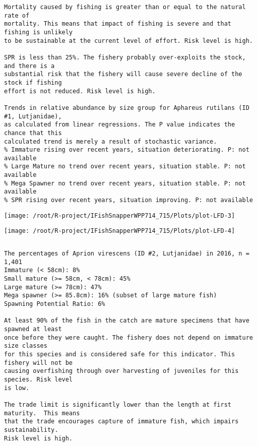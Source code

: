 \documentclass{report}\usepackage[]{graphicx}\usepackage[]{color}
\makeatletter
\def\maxwidth{ %
  \ifdim\Gin@nat@width>\linewidth
    \linewidth
  \else
    \Gin@nat@width
  \fi
}
\newenvironment{kframe}{%
 \def\at@end@of@kframe{}%
 \ifinner\ifhmode%
  \def\at@end@of@kframe{\end{minipage}}%
  \begin{minipage}{\columnwidth}%
 \fi\fi%
 \def\FrameCommand##1{\hskip\@totalleftmargin \hskip-\fboxsep
 \colorbox{shadecolor}{##1}\hskip-\fboxsep
     \hskip-\linewidth \hskip-\@totalleftmargin \hskip\columnwidth}%
 \MakeFramed {\advance\hsize-\width
   \@totalleftmargin\z@ \linewidth\hsize
   \@setminipage}}%
 {\par\unskip\endMakeFramed%
 \at@end@of@kframe}
\newenvironment{knitrout}{}{} %
\makeatother
\begin{document}
\begin{knitrout}
\begin{kframe}
\begin{verbatim}
Mortality caused by fishing is greater than or equal to the natural rate of
mortality. This means that impact of fishing is severe and that fishing is unlikely
to be sustainable at the current level of effort. Risk level is high.
 
SPR is less than 25%. The fishery probably over-exploits the stock, and there is a
substantial risk that the fishery will cause severe decline of the stock if fishing
effort is not reduced. Risk level is high.
 
Trends in relative abundance by size group for Aphareus rutilans (ID #1, Lutjanidae),
as calculated from linear regressions. The P value indicates the chance that this
calculated trend is merely a result of stochastic variance.
% Immature rising over recent years, situation deteriorating. P: not available
% Large Mature no trend over recent years, situation stable. P: not available
% Mega Spawner no trend over recent years, situation stable. P: not available
% SPR rising over recent years, situation improving. P: not available
\end{verbatim}
\end{kframe}
\texttt{[image: /root/R-project/IFishSnapperWPP714\_715/Plots/plot-LFD-3]} 

\texttt{[image: /root/R-project/IFishSnapperWPP714\_715/Plots/plot-LFD-4]} 
\begin{kframe}\begin{verbatim}
\end{verbatim}
\end{kframe}
\clearpage
\newpage
\begin{kframe}\begin{verbatim}The percentages of Aprion virescens (ID #2, Lutjanidae) in 2016, n = 1,401
Immature (< 58cm): 8%
Small mature (>= 58cm, < 78cm): 45%
Large mature (>= 78cm): 47%
Mega spawner (>= 85.8cm): 16% (subset of large mature fish)
Spawning Potential Ratio: 6%
 
At least 90% of the fish in the catch are mature specimens that have spawned at least
once before they were caught. The fishery does not depend on immature size classes
for this species and is considered safe for this indicator. This fishery will not be
causing overfishing through over harvesting of juveniles for this species. Risk level
is low.

The trade limit is significantly lower than the length at first maturity.  This means
that the trade encourages capture of immature fish, which impairs sustainability.
Risk level is high.


\end{verbatim}
\end{kframe}
\end{knitrout}
\end{document}
